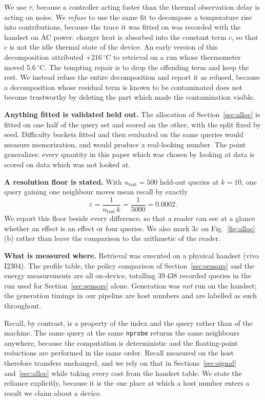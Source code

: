 \documentclass[journal]{IEEEtran}
\newcommand{\nprobe}{\texttt{nprobe}}
\newcommand{\degC}{\,^{\circ}\mathrm{C}}
\begin{document}
We use $\tau$, because a controller acting faster than the thermal
observation delay is acting on noise. We \emph{refuse} to use the same fit
to decompose a temperature rise into contributions, because the trace it
was fitted on was recorded with the handset on AC power: charger heat is
absorbed into the constant term $c$, so that $c$ is not the idle thermal
state of the device. An early version of this decomposition attributed
$+216\degC$ to retrieval on a run whose thermometer moved $5.6\degC$. The
tempting repair is to drop the offending term and keep the rest. We instead
refuse the entire decomposition and report it as refused, because a
decomposition whose residual term is known to be contaminated does not
become trustworthy by deleting the part which made the contamination
visible.

\textbf{Anything fitted is validated held out.} The allocation of
Section~\ref{sec:alloc} is fitted on one half of the query set and scored
on the other, with the split fixed by seed. Difficulty buckets fitted and
then evaluated on the same queries would measure memorization, and would
produce a real-looking number. The point generalizes: every quantity in
this paper which was chosen by looking at data is scored on data which was
not looked at.

\textbf{A resolution floor is stated.} With $n_{\mathrm{test}} = 500$
held-out queries at $k = 10$, one query gaining one neighbour moves mean
recall by exactly
\begin{equation}
\varepsilon = \frac{1}{n_{\mathrm{test}}\,k} = \frac{1}{5000} = 0.0002 .
\label{eq:floor}
\end{equation}
We report this floor beside every difference, so that a reader can see at a
glance whether an effect is an effect or four queries. We also mark
$3\varepsilon$ on Fig.~\ref{fig:alloc}(b) rather than leave the comparison
to the arithmetic of the reader.

\textbf{What is measured where.} Retrieval was executed on a physical
handset (vivo I2304). The profile table, the policy comparison of
Section~\ref{sec:sensors} and the energy measurements are all on-device,
totalling $39\,438$ recorded queries in the run used for
Section~\ref{sec:sensors} alone. Generation was \emph{not} run on the
handset; the generation timings in our pipeline are host numbers and are
labelled as such throughout.

Recall, by contrast, is a property of the index and the query rather than
of the machine. The same query at the same \nprobe{} returns the same
neighbours anywhere, because the computation is deterministic and the
floating-point reductions are performed in the same order. Recall measured
on the host therefore transfers unchanged, and we rely on that in
Sections~\ref{sec:signal} and~\ref{sec:alloc} while taking every cost from
the handset table. We state the reliance explicitly, because it is the one
place at which a host number enters a result we claim about a device.
\end{document}
